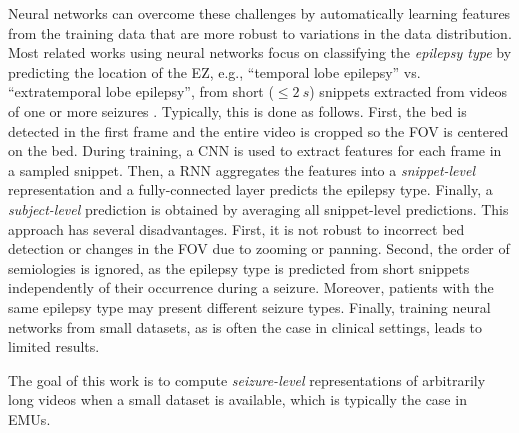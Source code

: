 Neural networks can overcome these challenges by automatically learning features from the training data that are more robust to variations in the data distribution.
Most related works using neural networks focus on classifying the \emph{epilepsy type} by predicting the location of the \ac{EZ}, e.g., ``temporal lobe epilepsy'' vs. ``extratemporal lobe epilepsy'', from short ($\le \SI{2}{s}$) snippets extracted from videos of one or more seizures \cite{ahmedt-aristizabal_deep_2018,ahmedt-aristizabal_hierarchical_2018,ahmedt-aristizabal_deep_2018-1,maia_epileptic_2019,karacsony_deep_2020}.
Typically, this is done as follows.
First, the bed is detected in the first frame and the entire video is cropped so the \ac{FOV} is centered on the bed.
During training, a \ac{CNN} is used to extract features for each frame in a sampled snippet.
Then, a \ac{RNN} aggregates the features into a \emph{snippet-level} representation and a fully-connected layer predicts the epilepsy type.
Finally, a \emph{subject-level} prediction is obtained by averaging all snippet-level predictions.
This approach has several disadvantages.
First, it is not robust to incorrect bed detection or changes in the \ac{FOV} due to zooming or panning.
Second, the order of semiologies is ignored, as the epilepsy type is predicted from short snippets independently of their occurrence during a seizure.
Moreover, patients with the same epilepsy type may present different seizure types.
Finally, training neural networks from small datasets, as is often the case in clinical settings, leads to limited results.

The goal of this work is to compute \emph{seizure-level} representations of arbitrarily long videos when a small dataset is available, which is typically the case in \acp{EMU}.

